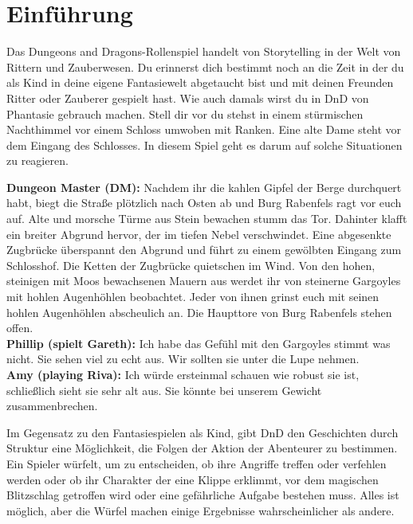 \chapter{Einführung}
Das Dungeons and Dragons-Rollenspiel handelt von Storytelling in der Welt von Rittern und Zauberwesen. Du erinnerst dich bestimmt noch an die Zeit in der du als Kind in deine eigene Fantasiewelt abgetaucht bist und mit deinen Freunden Ritter oder Zauberer gespielt hast. Wie auch damals wirst du in  DnD von Phantasie gebrauch machen. Stell dir vor du stehst in einem stürmischen Nachthimmel vor einem Schloss umwoben mit Ranken. Eine alte Dame steht vor dem Eingang des Schlosses. In diesem Spiel geht es darum auf solche Situationen zu reagieren.

\begin{quotebox}
\textbf{Dungeon Master (DM):}
Nachdem ihr die kahlen Gipfel der Berge durchquert habt, biegt die Straße plötzlich nach Osten ab und Burg Rabenfels ragt vor euch auf. Alte und morsche Türme aus Stein bewachen stumm das Tor. Dahinter klafft ein breiter Abgrund hervor, der im tiefen Nebel verschwindet. Eine abgesenkte Zugbrücke überspannt den Abgrund und führt zu einem gewölbten Eingang zum Schlosshof. Die Ketten der Zugbrücke quietschen im Wind. Von den hohen, steinigen mit Moos bewachsenen Mauern aus werdet ihr von steinerne Gargoyles mit hohlen Augenhöhlen beobachtet. Jeder von ihnen grinst euch mit seinen hohlen Augenhöhlen abscheulich an.  Die Haupttore von Burg Rabenfels stehen offen.\\
\textbf{Phillip (spielt Gareth):} Ich habe das Gefühl mit den Gargoyles stimmt was nicht. Sie sehen viel zu echt aus. Wir sollten sie unter die Lupe nehmen.\\
\textbf{Amy (playing Riva):} Ich würde ersteinmal schauen wie robust sie ist, schließlich sieht sie sehr alt aus. Sie könnte bei unserem Gewicht zusammenbrechen.
\end{quotebox}

Im Gegensatz zu den Fantasiespielen als Kind, gibt DnD den Geschichten durch Struktur eine Möglichkeit, die Folgen der Aktion der Abenteurer zu bestimmen. Ein Spieler würfelt, um zu entscheiden, ob ihre Angriffe treffen oder verfehlen werden oder ob ihr Charakter der eine Klippe erklimmt, vor dem magischen Blitzschlag getroffen wird oder eine gefährliche Aufgabe bestehen muss. Alles ist möglich, aber die Würfel machen einige Ergebnisse wahrscheinlicher als andere.

